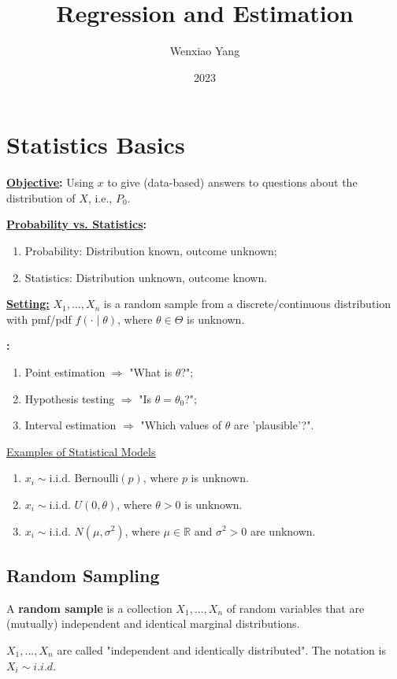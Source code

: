 \documentclass[11pt]{elegantbook}
\title{Regression and Estimation}
\author{Wenxiao Yang}
\institute{Haas School of Business, University of California Berkeley}
\date{2023}
\begin{document}
\maketitle

\frontmatter
\tableofcontents

\mainmatter


\chapter{Statistics Basics}
\textbf{\underline{Objective}:} Using $x$ to give (data-based) answers to questions about the distribution of $X$, i.e., $P_0$.

\textbf{\underline{Probability vs. Statistics}:}
\begin{enumerate}[$\circ$]
    \item Probability: Distribution known, outcome unknown;
    \item Statistics: Distribution unknown, outcome known.
\end{enumerate}

\textbf{\underline{Setting:}} $X_1,...,X_n$ is a random sample from a discrete/continuous distribution with pmf/pdf $f(\cdot\mid \theta)$, where $\theta\in\Theta$ is unknown.

\textbf{:}
\begin{enumerate}[$\circ$]
    \item Point estimation $\Rightarrow$ "What is $\theta$?";
    \item Hypothesis testing $\Rightarrow$ "Is $\theta=\theta_0$?";
    \item Interval estimation $\Rightarrow$ "Which values of $\theta$ are 'plausible'?".
\end{enumerate}

\begin{example}
    \underline{Examples of Statistical Models}
    \begin{enumerate}[(1).]
        \item $x_i\sim \text{i.i.d. } \text{Bernoulli}(p)$, where $p$ is unknown.
        \item $x_i\sim \text{i.i.d. } U(0,\theta)$, where $\theta>0$ is unknown.
        \item $x_i\sim \text{i.i.d. } N(\mu,\sigma^2)$, where $\mu\in \mathbb{R}$ and $\sigma^2>0$ are unknown.
    \end{enumerate}
\end{example}
\section{Random Sampling}
\begin{definition}
    \normalfont
    A \textbf{random sample} is a collection $X_1,...,X_n$ of random variables that are (mutually) independent and identical marginal distributions.

    $X_1,...,X_n$ are called "independent and identically distributed". The notation is $X_i\sim i.i.d. $
\end{definition}
\end{document}
